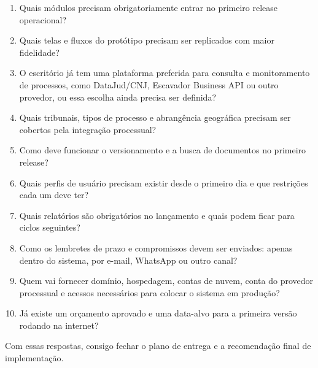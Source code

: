 \documentclass[11pt,a4paper]{article}
\begin{document}
\begin{enumerate}
\item Quais módulos precisam obrigatoriamente entrar no primeiro release operacional?
\item Quais telas e fluxos do protótipo precisam ser replicados com maior fidelidade?
\item O escritório já tem uma plataforma preferida para consulta e monitoramento de processos, como DataJud/CNJ, Escavador Business API ou outro provedor, ou essa escolha ainda precisa ser definida?
\item Quais tribunais, tipos de processo e abrangência geográfica precisam ser cobertos pela integração processual?
\item Como deve funcionar o versionamento e a busca de documentos no primeiro release?
\item Quais perfis de usuário precisam existir desde o primeiro dia e que restrições cada um deve ter?
\item Quais relatórios são obrigatórios no lançamento e quais podem ficar para ciclos seguintes?
\item Como os lembretes de prazo e compromissos devem ser enviados: apenas dentro do sistema, por e-mail, WhatsApp ou outro canal?
\item Quem vai fornecer domínio, hospedagem, contas de nuvem, conta do provedor processual e acessos necessários para colocar o sistema em produção?
\item Já existe um orçamento aprovado e uma data-alvo para a primeira versão rodando na internet?
\end{enumerate}

Com essas respostas, consigo fechar o plano de entrega e a recomendação final de implementação.\par
\end{document}
